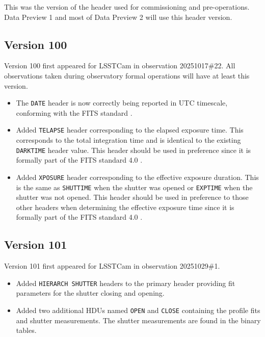 \documentclass[OPS,lsstdraft,authoryear,toc]{lsstdoc}
\begin{document}
This was the version of the header used for commissioning and pre-operations.
Data Preview 1  and most of Data Preview 2 will use this header version.

\subsection{Version 100}

Version 100 first appeared for LSSTCam in observation 20251017\#22.
All observations taken during observatory formal operations will have at least this version.

\begin{itemize}
\item The \texttt{DATE} header is now correctly being reported in UTC timescale, conforming with the FITS standard \citep{2010A&A...524A..42P}.
\item Added \texttt{TELAPSE} header corresponding to the elapsed exposure time.
      This corresponds to the total integration time and is identical to the existing \texttt{DARKTIME} header value.
      This header should be used in preference since it is formally part of the FITS standard 4.0 \citep{FITS4}.
\item Added \texttt{XPOSURE} header corresponding to the effective exposure duration.
      This is the same as \texttt{SHUTTIME} when the shutter was opened or \texttt{EXPTIME} when the shutter was not opened.
      This header should be used in preference to those other headers when determining the effective exposure time since it is formally part of the FITS standard 4.0 \citep{FITS4}.
\end{itemize}

\subsection{Version 101}

Version 101 first appeared for LSSTCam in observation 20251029\#1.

\begin{itemize}
  \item Added \texttt{HIERARCH SHUTTER} headers to the primary header providing fit parameters for the shutter closing and opening.
  \item Added two additional HDUs named \texttt{OPEN} and \texttt{CLOSE} containing the profile fits and shutter measurements.
  The shutter measurements are found in the binary tables.
\end{itemize}
\end{document}
